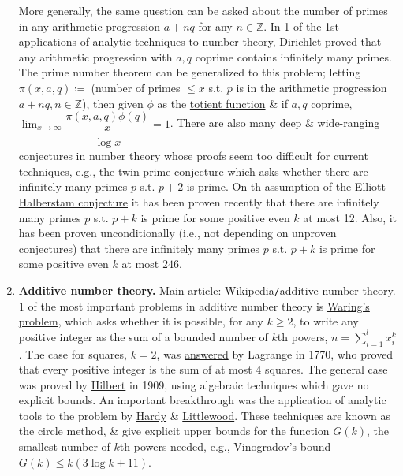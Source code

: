 \documentclass{article}
\begin{document}
\begin{enumerate}
	More generally, the same question can be asked about the number of primes in any \href{https://en.wikipedia.org/wiki/Arithmetic_progression}{arithmetic progression} $a + nq$ for any $n\in\mathbb{Z}$. In 1 of the 1st applications of analytic techniques to number theory, {\sc Dirichlet} proved that any arithmetic progression with $a,q$ coprime contains infinitely many primes. The prime number theorem can be generalized to this problem; letting $\pi(x,a,q)\coloneqq$ (number of primes $\le x$ s.t. $p$ is in the arithmetic progression $a + nq,n\in\mathbb{Z}$), then given $\phi$ as the \href{https://en.wikipedia.org/wiki/Totient_function}{totient function} \& if $a,q$ coprime, $\lim_{x\to\infty} \dfrac{\pi(x,a,q)\phi(q)}{\dfrac{x}{\log x}} = 1$. There are also many deep \& wide-ranging conjectures in number theory whose proofs seem too difficult for current techniques, e.g., the \href{https://en.wikipedia.org/wiki/Twin_prime}{twin prime conjecture} which asks whether there are infinitely many primes $p$ s.t. $p + 2$ is prime. On th assumption of the \href{https://en.wikipedia.org/wiki/Elliott%E2%80%93Halberstam_conjecture}{Elliott--Halberstam conjecture} it has been proven recently that there are infinitely many primes $p$ s.t. $p + k$ is prime for some positive even $k$ at most 12. Also, it has been proven unconditionally (i.e., not depending on unproven conjectures) that there are infinitely many primes $p$ s.t. $p + k$ is prime for some positive even $k$ at most $246$.
	\item {\bf Additive number theory.} Main article: \href{https://en.wikipedia.org/wiki/Additive_number_theory}{Wikipedia{\tt/}additive number theory}. 1 of the most important problems in additive number theory is \href{https://en.wikipedia.org/wiki/Waring%27s_problem}{Waring's problem}, which asks whether it is possible, for any $k\ge2$, to write any positive integer as the sum of a bounded number of $k$th powers, $n = \sum_{i=1}^l x_i^k$. The case for squares, $k = 2$, was \href{https://en.wikipedia.org/wiki/Lagrange%27s_four-square_theorem}{answered} by {\sc Lagrange} in 1770, who proved that every positive integer is the sum of at most 4 squares. The general case was proved by \href{https://en.wikipedia.org/wiki/David_Hilbert}{\sc Hilbert} in 1909, using algebraic techniques which gave no explicit bounds. An important breakthrough was the application of analytic tools to the problem by \href{https://en.wikipedia.org/wiki/G._H._Hardy}{\sc Hardy} \& \href{https://en.wikipedia.org/wiki/John_Edensor_Littlewood}{\sc Littlewood}. These techniques are known as the circle method, \& give explicit upper bounds for the function $G(k)$, the smallest number of $k$th powers needed, e.g., \href{https://en.wikipedia.org/wiki/Ivan_Matveyevich_Vinogradov}{\sc Vinogradov}'s bound $G(k)\le k(3\log k + 11)$.

\end{enumerate}
\end{document}
